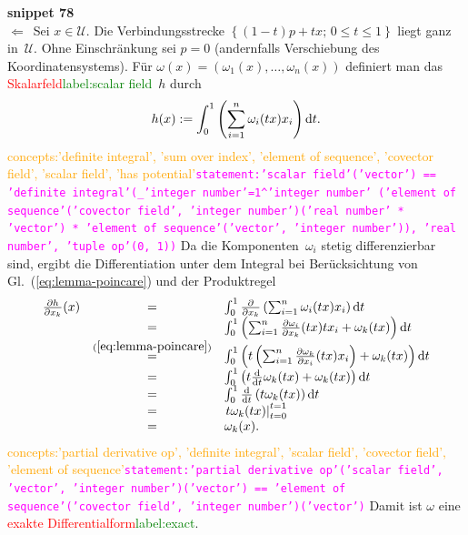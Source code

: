 \documentclass[a4paper,twoside,english,ngerman,deutsch,german,sectrefs,envcountsame,envcountchap]{svmono}
\newcommand{\setref}[2]{\textcolor{red}{#1}\textcolor{green}{#2}}
\newcommand{\snippet}[1]{\textbf{snippet #1}\\}
\newcommand{\eqnote}[2]{\textcolor{orange}{#1}\textcolor{magenta}{\texttt{#2}}}
\begin{document}
\begin{svmultproof}
\snippet{78}
\glqq$\Leftarrow$\grqq\ Sei $x\in\mathcal{U}$. Die Verbindungsstrecke $\left\{ (1-t)p+tx;\,0\leq t\leq1\right\} $
liegt ganz in~$\mathcal{U}$. Ohne Einschränkung sei $p=0$ (andernfalls
Verschiebung des Koordinatensystems). Für $\omega(x)=(\omega_{1}(x),\ldots,\omega_{n}(x))$
definiert man das \setref{Skalarfeld}{label:scalar field}~$h$ durch
\begin{equation}
h(x):=\int_{0}^{1}\left(\sum_{i=1}^{n}\omega_{i}(tx)x_{i}\right)\mathrm{d} t.\label{eq:potential-poincare}
\end{equation}\eqnote{concepts:'definite integral', 'sum over index', 'element of sequence', 'covector field', 'scalar field', 'has potential'}{statement:'scalar field'('vector') == 'definite integral'(\sum_{'integer number'=1}^'integer number' ('element of sequence'('covector field', 'integer number')('real number' * 'vector') * 'element of sequence'('vector', 'integer number')), 'real number', 'tuple op'(0, 1))}
 Da die Komponenten~$\omega_{i}$ stetig differenzierbar sind, ergibt
die Differentiation unter dem Integral bei Berücksichtung von Gl.~(\ref{eq:lemma-poincare})
und der Produktregel
\[
\begin{array}{ccl}
\frac{\partial h}{\partial x_{k}}(x) & = & \int_{0}^{1}\frac{\partial}{\partial x_{k}}\left(\sum_{i=1}^{n}\omega_{i}(tx)x_{i}\right)\mathrm{d} t\\
 & = & \int_{0}^{1}\left(\sum_{i=1}^{n}\frac{\partial\omega_{i}}{\partial x_{k}}(tx)tx_{i}+\omega_{k}(tx)\right)\mathrm{d} t\\
 & \stackrel{(\ref{eq:lemma-poincare})}{=} & \int_{0}^{1}\left(t\left(\sum_{i=1}^{n}\frac{\partial\omega_{k}}{\partial x_{i}}(tx)x_{i}\right)+\omega_{k}(tx)\right)\mathrm{d} t\\
 & = & \int_{0}^{1}\left(t\frac{{\mathrm{d}}}{{\mathrm{d}} t}\omega_{k}(tx)+\omega_{k}(tx)\right)\mathrm{d} t\\
 & = & \int_{0}^{1}\frac{{\mathrm{d}}}{{\mathrm{d}} t}\left(t\omega_{k}(tx)\right)\mathrm{d} t\\
 & = & \left.t\omega_{k}(tx)\right|_{t=0}^{t=1}\\
 & = & \omega_{k}(x).
\end{array}
\]\eqnote{concepts:'partial derivative op', 'definite integral', 'scalar field', 'covector field', 'element of sequence'}{statement:'partial derivative op'('scalar field', 'vector', 'integer number')('vector') == 'element of sequence'('covector field', 'integer number')('vector')}
Damit ist $\omega$ eine \setref{exakte Differentialform}{label:exact}.
\end{svmultproof}
\end{document}
